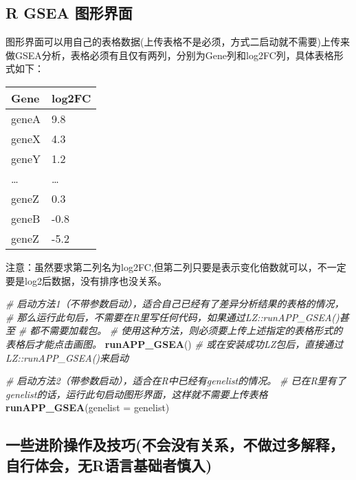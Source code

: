 \documentclass[
]{book}
\newenvironment{Shaded}{\begin{snugshade}}{\end{snugshade}}
\newcommand{\AttributeTok}[1]{\textcolor[rgb]{0.13,0.29,0.53}{#1}}
\newcommand{\CommentTok}[1]{\textcolor[rgb]{0.56,0.35,0.01}{\textit{#1}}}
\newcommand{\FunctionTok}[1]{\textcolor[rgb]{0.13,0.29,0.53}{\textbf{#1}}}
\newcommand{\NormalTok}[1]{#1}
\begin{document}
\subsection{R GSEA 图形界面}\label{enrich-gsea-r.gsea.gui}

图形界面可以用自己的表格数据(上传表格不是必须，方式二启动就不需要)上传来做GSEA分析，表格必须有且仅有两列，分别为Gene列和log2FC列，具体表格形式如下：

\begin{longtable}[]{@{}ll@{}}
\toprule\noalign{}
Gene & log2FC \\
\midrule\noalign{}
\endhead
\bottomrule\noalign{}
\endlastfoot
geneA & 9.8 \\
geneX & 4.3 \\
geneY & 1.2 \\
\ldots{} & \ldots{} \\
geneZ & 0.3 \\
geneB & -0.8 \\
geneZ & -5.2 \\
\end{longtable}

注意：虽然要求第二列名为log2FC,但第二列只要是表示变化倍数就可以，不一定要是log2后数据，没有排序也没关系。

\begin{Shaded}
\begin{Highlighting}[]
\CommentTok{\# 启动方法1（不带参数启动），适合自己已经有了差异分析结果的表格的情况，}
\CommentTok{\#  那么运行此句后，不需要在R里写任何代码，如果通过LZ::runAPP\_GSEA()甚至}
\CommentTok{\#  都不需要加载包。}
\CommentTok{\#  使用这种方法，则必须要上传上述指定的表格形式的表格后才能点击画图。}
\FunctionTok{runAPP\_GSEA}\NormalTok{() }\CommentTok{\# 或在安装成功LZ包后，直接通过LZ::runAPP\_GSEA()来启动}

\CommentTok{\# 启动方法2（带参数启动），适合在R中已经有genelist的情况。}
\CommentTok{\# 已在R里有了genelist的话，运行此句启动图形界面，这样就不需要上传表格}
\FunctionTok{runAPP\_GSEA}\NormalTok{(}\AttributeTok{genelist =}\NormalTok{ genelist)}
\end{Highlighting}
\end{Shaded}

\subsection{一些进阶操作及技巧(不会没有关系，不做过多解释，自行体会，无R语言基础者慎入)}\label{ux4e00ux4e9bux8fdbux9636ux64cdux4f5cux53caux6280ux5de7ux4e0dux4f1aux6ca1ux6709ux5173ux7cfbux4e0dux505aux8fc7ux591aux89e3ux91caux81eaux884cux4f53ux4f1aux65e0rux8bedux8a00ux57faux7840ux8005ux614eux5165}
\end{document}
